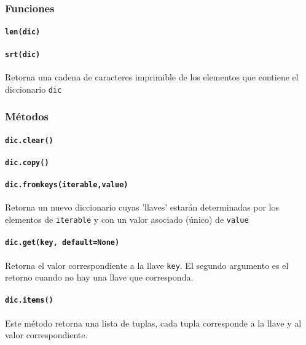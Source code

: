 \subsubsection{Funciones}

\paragraph{\texttt{len(dic)}}

\paragraph{\texttt{srt(dic)}} Retorna una cadena de caracteres imprimible de
los elementos que contiene el diccionario \texttt{dic}

\subsubsection{Métodos}

\paragraph{\texttt{dic.clear()}}

\paragraph{\texttt{dic.copy()}}

\paragraph{\texttt{dic.fromkeys(iterable,value)}} Retorna un nuevo diccionario
cuyas 'llaves' estarán determinadas por los elementos de \texttt{iterable} y
con un valor asociado (único) de \texttt{value}

\paragraph{\texttt{dic.get(key, default=None)}} Retorna el valor
correspondiente a la llave \texttt{key}. El segundo argumento es el retorno
cuando no hay una llave que corresponda.

\paragraph{\texttt{dic.items()}} Este método retorna una lista de tuplas, cada
tupla corresponde a la llave y al valor correspondiente.

